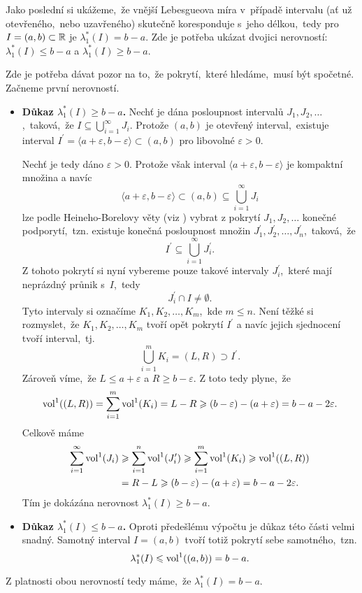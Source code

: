 \begin{example}\label{ex:lebegueova-mira-delka-intervalu}
    Jako poslední si ukážeme,~že vnější Lebesgueova míra v~případě intervalu (ať už otevřeného,~nebo uzavřeného) skutečně koresponduje s~jeho délkou,~tedy pro $I=(a,b)\subset\mathbb{R}$ je $\lambda_1^*(I)=b-a$. Zde je potřeba ukázat dvojici nerovností: $\lambda_1^*(I)\leqslant b-a$ a $\lambda_1^*(I)\geqslant b-a$.

    Zde je potřeba dávat pozor na to,~že pokrytí,~které hledáme,~musí být spočetné. Začneme první nerovností.

    \begin{itemize}
        \item \textbf{Důkaz $\lambda_1^*(I)\geqslant b-a$.} Nechť je dána posloupnost intervalů $J_1,J_2,\ldots$,~taková,~že $I\subseteq\bigcup_{i=1}^\infty J_i$. Protože $(a,b)$ je otevřený interval,~existuje interval $I^\prime=\langle a+\varepsilon,b-\varepsilon\rangle\subset(a,b)$ pro libovolné $\varepsilon>0$.
        
        Nechť je tedy dáno $\varepsilon>0$. Protože však interval $\langle a+\varepsilon,b-\varepsilon\rangle$ je kompaktní množina a navíc
        \[\langle a+\varepsilon,b-\varepsilon\rangle\subset(a,b)\subseteq\bigcup_{i=1}^\infty J_i\]
        lze podle Heineho-Borelovy věty (viz ) vybrat z pokrytí $J_1,J_2,\ldots$ konečné podporytí,~tzn. existuje konečná posloupnost množin $J_1^\prime,J_2^\prime,\ldots,J_n^\prime$,~taková,~že
        \[I^\prime\subseteq\bigcup_{i=1}^\infty J_i^\prime.\]
        Z tohoto pokrytí si nyní vybereme pouze takové intervaly $J_i^\prime$,~které mají neprázdný průnik s~$I$,~tedy
        \[J_i^\prime\cap I\neq\emptyset.\]
        Tyto intervaly si označíme $K_1,K_2,\ldots,K_m$,~kde $m\leqslant n$. Není těžké si rozmyslet,~že $K_1,K_2,\ldots,K_m$ tvoří opět pokrytí $I^\prime$ a navíc jejich sjednocení tvoří interval,~tj.
        \[\bigcup_{i=1}^m K_i=(L,R)\supset I^\prime.\]
        Zároveň víme,~že $L\leqslant a+\varepsilon$ a $R\geqslant b-\varepsilon$. Z toto tedy plyne,~že
        \[\operatorname{vol}^1((L,R))=\sum_{i=1}^{m}\operatorname{vol}^1(K_i)=L-R\geqslant (b-\varepsilon)-(a+\varepsilon)=b-a-2\varepsilon.\]
        Celkově máme
        \begin{align*}
            \sum_{i=1}^{\infty}\operatorname{vol}^1(J_i)&\geqslant\sum_{i=1}^{n}\operatorname{vol}^1(J_i^\prime)\geqslant\sum_{i=1}^{m}\operatorname{vol}^1(K_i)\geqslant\operatorname{vol}^1((L,R))\\
            &=R-L\geqslant (b-\varepsilon)-(a+\varepsilon)=b-a-2\varepsilon.
        \end{align*}
        Tím je dokázána nerovnost $\lambda_1^*(I)\geqslant b-a$.
        \item \textbf{Důkaz $\lambda_1^*(I)\leqslant b-a$.} Oproti předešlému výpočtu je důkaz této části velmi snadný. Samotný interval $I=(a,b)$ tvoří totiž pokrytí sebe samotného,~tzn.
        \[\lambda_1^*(I)\leqslant\operatorname{vol}^1((a,b))=b-a.\]
    \end{itemize}
    Z platnosti obou nerovností tedy máme,~že $\lambda_1^*(I)=b-a$.
\end{example}
